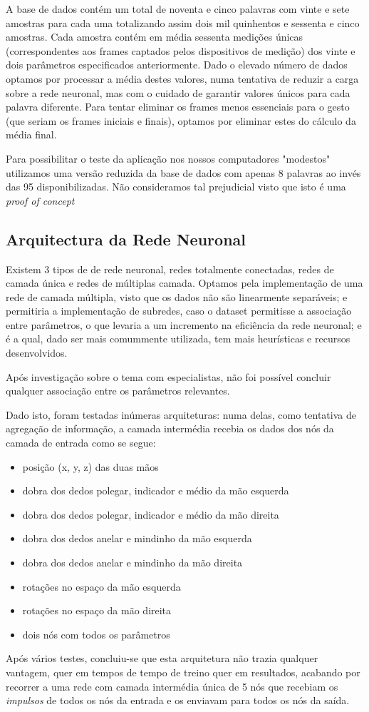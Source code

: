 \documentclass[10pt,a4paper]{article}
\begin{document}
A base de dados contém um total de noventa e cinco palavras com vinte e sete amostras para cada uma totalizando assim dois mil quinhentos e sessenta e cinco amostras.
Cada amostra contém em média sessenta medições únicas (correspondentes aos frames captados pelos dispositivos de medição) dos vinte e dois parâmetros especificados anteriormente.
Dado o elevado número de dados optamos por processar a média destes valores, numa tentativa de reduzir a carga sobre a rede neuronal, mas com o cuidado de garantir valores únicos para cada palavra diferente. Para tentar eliminar os frames menos essenciais para o gesto (que seriam os frames iniciais e finais), optamos por eliminar estes do cálculo da média final.

Para possibilitar o teste da aplicação nos nossos computadores "modestos" utilizamos uma versão reduzida da base de dados com apenas 8 palavras ao invés das 95 disponibilizadas. Não consideramos tal prejudicial visto que isto é uma \textit{proof of concept}

\subsection{Arquitectura da Rede Neuronal}

Existem 3 tipos de de rede neuronal, redes totalmente conectadas, redes de camada única e redes de múltiplas camada.
Optamos pela implementação de uma rede de camada múltipla, visto que os dados não são linearmente separáveis; e permitiria a implementação de subredes, caso o dataset permitisse a associação entre parâmetros, o que levaria a um incremento na eficiência da rede neuronal; e é a qual, dado ser mais comummente utilizada, tem mais heurísticas e recursos desenvolvidos.

Após investigação sobre o tema com especialistas, não foi possível concluir qualquer associação entre os parâmetros relevantes.

Dado isto, foram testadas inúmeras arquiteturas: numa delas, como tentativa de agregação de informação, a camada intermédia recebia os dados dos nós da camada de entrada como se segue:
\begin{itemize}
\item posição (x, y, z) das duas mãos
\item dobra dos dedos polegar, indicador e médio da mão esquerda
\item dobra dos dedos polegar, indicador e médio da mão direita
\item dobra dos dedos anelar e mindinho da mão esquerda
\item dobra dos dedos anelar e mindinho da mão direita
\item rotações no espaço da mão esquerda
\item rotações no espaço da mão direita
\item dois nós com todos os parâmetros
\end{itemize}
Após vários testes, concluiu-se que esta arquitetura não trazia qualquer vantagem, quer em tempos de tempo de treino quer em resultados, acabando por recorrer a uma rede com camada intermédia única de 5 nós que recebiam os \textit{impulsos} de todos os nós da entrada e os enviavam para todos os nós da saída.
\end{document}
